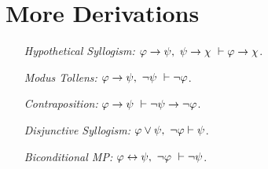 \documentclass[a4paper, 11pt]{article} %
\begin{document}
\section*{More Derivations}

\begin{enumerate}[leftmargin=1.5in]
  \item[\it Hypothetical Syllogism:] $\metaA \eif \metaB,\ \metaB \eif \metaC\ \vdash \metaA \eif \metaC$.
  \item[\it Modus Tollens:] $\varphi \rightarrow \psi,\ \neg\psi\ \vdash \neg\varphi$.
  \item[\it Contraposition:] $\varphi \rightarrow \psi\ \vdash \neg\psi \rightarrow \neg\varphi$.
  \item[\it Disjunctive Syllogism:] $\varphi \vee \psi,\ \neg \varphi \vdash \psi$.
  \item[\it Biconditional MP:] $\varphi \leftrightarrow \psi,\ \neg\varphi\ \vdash \neg\psi$.
\end{enumerate}
\end{document}

